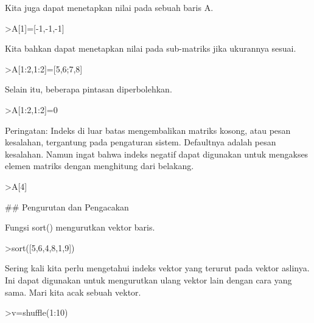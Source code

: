 \documentclass[a4paper,10pt]{article}
\begin{document}
\begin{eulernotebook}
\begin{euleroutput}
  Kita juga dapat menetapkan nilai pada sebuah baris A.
  
\end{euleroutput}
\begin{eulerprompt}
>A[1]=[-1,-1,-1]
\end{eulerprompt}
\begin{euleroutput}
  
  Kita bahkan dapat menetapkan nilai pada sub-matriks jika ukurannya sesuai.
  
\end{euleroutput}
\begin{eulerprompt}
>A[1:2,1:2]=[5,6;7,8]
\end{eulerprompt}
\begin{euleroutput}
  
  Selain itu, beberapa pintasan diperbolehkan.
  
\end{euleroutput}
\begin{eulerprompt}
>A[1:2,1:2]=0
\end{eulerprompt}
\begin{euleroutput}
  
  Peringatan: Indeks di luar batas mengembalikan matriks kosong, atau pesan kesalahan, tergantung pada pengaturan sistem. Defaultnya adalah pesan kesalahan. Namun ingat bahwa indeks negatif dapat digunakan untuk mengakses elemen matriks dengan menghitung dari belakang.
  
\end{euleroutput}
\begin{eulerprompt}
>A[4]
\end{eulerprompt}
\begin{euleroutput}
  
  ## Pengurutan dan Pengacakan
  
  Fungsi sort() mengurutkan vektor baris.
  
\end{euleroutput}
\begin{eulerprompt}
>sort([5,6,4,8,1,9])
\end{eulerprompt}
\begin{euleroutput}
  
  Sering kali kita perlu mengetahui indeks vektor yang terurut pada vektor aslinya. Ini dapat digunakan untuk mengurutkan ulang vektor lain dengan cara yang sama. Mari kita acak sebuah vektor.
  
\end{euleroutput}
\begin{eulerprompt}
>v=shuffle(1:10)
\end{eulerprompt}
\begin{euleroutput}
  

\end{euleroutput}
\end{eulernotebook}
\end{document}
